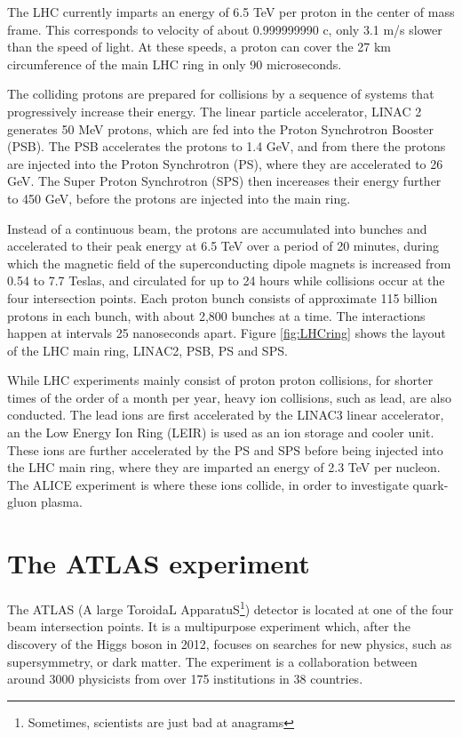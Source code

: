 \documentclass[11pt,a4paper,openright,twoside]{report}
\begin{document}
The LHC currently imparts an energy of 6.5 TeV per proton in the center of mass frame. This corresponds to velocity of about 0.999999990 c, only 3.1 m/s slower than the speed of light. At these speeds, a proton can cover the 27 km circumference of the main LHC ring in only 90 microseconds.

The colliding protons are prepared for collisions by a sequence of systems that progressively increase their energy. The linear particle accelerator, LINAC 2 generates 50 MeV protons, which are fed into the Proton Synchrotron Booster (PSB). The PSB accelerates the protons to 1.4 GeV, and from there the protons are injected into the Proton Synchrotron (PS), where they are accelerated to 26 GeV. The Super Proton Synchrotron (SPS) then incereases their energy further to 450 GeV, before the protons are injected into the main ring. 

Instead of a continuous beam, the protons are accumulated into bunches and accelerated to their peak energy at 6.5 TeV over a period of 20 minutes, during which the magnetic field of the superconducting dipole magnets is increased from 0.54 to 7.7 Teslas, and circulated for up to 24 hours while collisions occur at the four intersection points. Each proton bunch consists of approximate 115 billion protons in each bunch, with about 2,800 bunches at a time. The interactions happen at intervals 25 nanoseconds apart. Figure \ref{fig:LHCring} shows the layout of the LHC main ring, LINAC2, PSB, PS and SPS.

While LHC experiments mainly consist of proton proton collisions, for shorter times of the order of a month per year, heavy ion collisions, such as lead, are also conducted. The lead ions are first accelerated by the LINAC3 linear accelerator, an the Low Energy Ion Ring (LEIR) is used as an ion storage and cooler unit. These ions are further accelerated by the PS and SPS before being injected into the LHC main ring, where they are imparted an energy of 2.3 TeV per nucleon. The ALICE experiment is where these ions collide, in order to investigate quark-gluon plasma.

\section{The ATLAS experiment}
The ATLAS (A large ToroidaL ApparatuS\footnote{Sometimes, scientists are just bad at anagrams}) detector is located at one of the four beam intersection points. It is a multipurpose experiment which, after the discovery of the Higgs boson in 2012, focuses on searches for new physics, such as supersymmetry, or dark matter. The experiment is a collaboration between around 3000 physicists from over 175 institutions in 38 countries.
\end{document}
